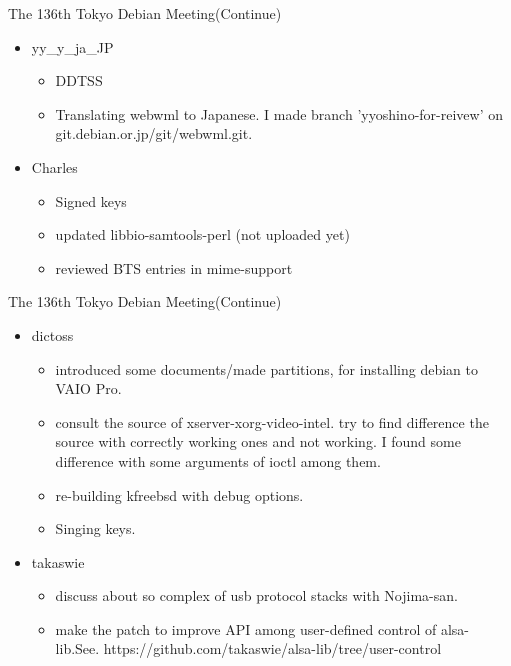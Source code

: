\begin{frame}{The 136th Tokyo Debian Meeting(Continue)}

\begin{itemize}
\item yy\_y\_ja\_JP\\
  \begin{itemize}
  \item DDTSS
  \item Translating webwml to Japanese. I made branch 'yyoshino-for-reivew' on git.debian.or.jp/git/webwml.git.
  \end{itemize}
\item Charles\\
  \begin{itemize}
  \item Signed keys
  \item updated libbio-samtools-perl (not uploaded yet)
  \item reviewed BTS entries in mime-support
  \end{itemize}
\end{itemize}
\end{frame}

\begin{frame}{The 136th Tokyo Debian Meeting(Continue)}

\begin{itemize}
\item dictoss\\
  \begin{itemize}
    \item introduced some documents/made partitions, for installing debian to VAIO Pro.
    \item consult the source of xserver-xorg-video-intel. try to find difference  the source with correctly working ones and not working. I found some difference with some arguments of ioctl among them.
    \item re-building kfreebsd with debug options.
    \item Singing keys.
  \end{itemize}
\item takaswie
  \begin{itemize}
  \item discuss about so complex of usb protocol stacks with Nojima-san.
  \item make the patch to improve API among user-defined control of alsa-lib.See. https://github.com/takaswie/alsa-lib/tree/user-control
  \end{itemize}
\end{itemize}
\end{frame}

